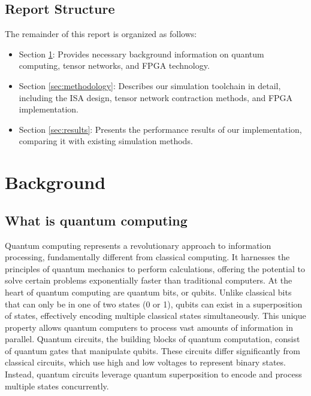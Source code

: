 \documentclass[12pt,oneside,a4paper]{article}
\begin{document}
\subsection{Report Structure}

The remainder of this report is organized as follows:

\begin{itemize}
    \item Section \ref{sec:background}: Provides necessary background information on quantum computing, tensor networks, and FPGA technology.
    \item Section \ref{sec:methodology}: Describes our simulation toolchain in detail, including the ISA design, tensor network contraction methods, and FPGA implementation.
    \item Section \ref{sec:results}: Presents the performance results of our implementation, comparing it with existing simulation methods.
\end{itemize}



\section{Background}
\label{sec:background}

\subsection{What is quantum computing}
Quantum computing represents a revolutionary approach to information processing, fundamentally different from classical computing. It harnesses the principles of quantum mechanics to perform calculations, offering the potential to solve certain problems exponentially faster than traditional computers.
At the heart of quantum computing are quantum bits, or qubits. Unlike classical bits that can only be in one of two states (0 or 1), qubits can exist in a superposition of states, effectively encoding multiple classical states simultaneously. This unique property allows quantum computers to process vast amounts of information in parallel.
Quantum circuits, the building blocks of quantum computation, consist of quantum gates that manipulate qubits. These circuits differ significantly from classical circuits, which use high and low voltages to represent binary states. Instead, quantum circuits leverage quantum superposition to encode and process multiple states concurrently.
\end{document}
